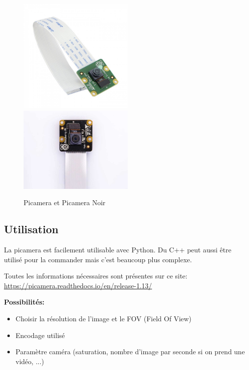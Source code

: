 \documentclass[a4paper, 11pt]{report}
\begin{document}
\begin{figure}[h!]
\begin{centering}
\includegraphics[width=0.5\textwidth]{images/picamera.jpg}
\includegraphics[width=0.5\textwidth]{images/picameraNoir.jpg}
\caption{Picamera et Picamera Noir}
\par\end{centering}
\end{figure}

\subsection{Utilisation}
La picamera est facilement utilisable avec Python. Du C++ peut aussi être utilisé pour la commander mais c'est beaucoup plus complexe.

Toutes les informations nécessaires sont présentes sur ce site: \url{https://picamera.readthedocs.io/en/release-1.13/}

\textbf{Possibilités:}
\begin{itemize}
\item Choisir la résolution de l'image et le FOV (Field Of View)
\item Encodage utilisé
\item Paramètre caméra (saturation, nombre d'image par seconde si on prend une vidéo, ...)
\end{itemize}
\end{document}
